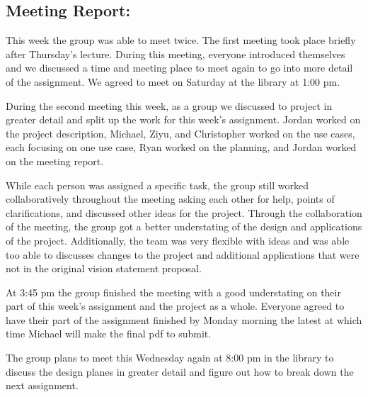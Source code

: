\documentclass[a4paper]{article}
\begin{document}
\subsection{Meeting Report:}
This week the group was able to meet twice. The first meeting took place briefly after Thursday's lecture. During this meeting, everyone introduced themselves and we discussed a time and meeting place to meet again to go into more detail of the assignment. We agreed to meet on Saturday at the library at 1:00 pm.

During the second meeting this week, as a group we discussed to project in greater detail and split up the work for this week’s assignment. Jordan worked on the project description, Michael, Ziyu, and Christopher worked on the use cases, each focusing on one use case, Ryan worked on the planning, and Jordan worked on the meeting report. 

While each person was assigned a specific task, the group still worked collaboratively throughout the meeting asking each other for help, points of clarifications, and discussed other ideas for the project. Through the collaboration of the meeting, the group got a better understating of the design and applications of the project. Additionally, the team was very flexible with ideas and was able too able to discusses changes to the project and additional applications that were not in the original vision statement proposal. 

At 3:45 pm the group finished the meeting with a good understating on their part of this week’s assignment and the project as a whole. Everyone agreed to have their part of the assignment finished by Monday morning the latest at which time Michael will make the final pdf to submit. 

The group plans to meet this Wednesday again at 8:00 pm in the library to discuss the design planes in greater detail and figure out how to break down the next assignment.   
\end{document}
